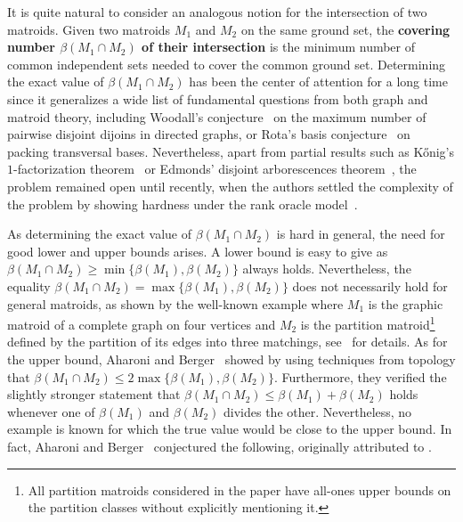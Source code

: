 \documentclass[11pt,a4paper]{article}
\theoremstyle{plain}
\theoremstyle{definition}
\begin{document}
It is quite natural to consider an analogous notion for the intersection of two matroids. Given two matroids $M_1$ and $M_2$ on the same ground set, the \textbf{covering number $\beta(M_1\cap M_2)$ of their intersection} is the minimum number of common independent sets needed to cover the common ground set. Determining the exact value of $\beta(M_1\cap M_2)$ has been the center of attention for a long time since it generalizes a wide list of fundamental questions from both graph and matroid theory, including Woodall's conjecture~\cite{woodall1978menger} on the maximum number of pairwise disjoint dijoins in directed graphs, or Rota's basis conjecture~\cite{huang1994relations} on packing transversal bases. Nevertheless, apart from partial results such as K\H{o}nig's $1$-factorization theorem~\cite{konig1916graphen} or Edmonds' disjoint arborescences theorem~\cite{edmonds1973edge}, the problem remained open until recently, when the authors settled the complexity of the problem by showing hardness under the rank oracle model~\cite{berczi2021complexity}.

As determining the exact value of $\beta(M_1\cap M_2)$ is hard in general, the need for good lower and upper bounds arises. A lower bound is easy to give as $\beta(M_1\cap M_2)\geq\min\{\beta(M_1),\beta(M_2)\}$ always holds. Nevertheless, the equality $\beta(M_1\cap M_2) = \max\{\beta(M_1), \beta(M_2)\}$ does not necessarily hold for general matroids, as shown by the well-known example where $M_1$ is the graphic matroid of a complete graph on four vertices and $M_2$ is the partition matroid\footnote{All partition matroids considered in the paper have all-ones upper bounds on the partition classes without explicitly mentioning it.} defined by the partition of its edges into three matchings, see~\cite{schrijver2003combinatorial} for details. As for the upper bound, Aharoni and Berger~\cite{aharoni2006intersection} showed by using techniques from topology that $\beta(M_1\cap M_2)\leq 2\max\{\beta(M_1),\beta(M_2)\}$. Furthermore, they verified the slightly stronger statement that $\beta(M_1\cap M_2) \le \beta(M_1)+\beta(M_2)$ holds whenever one of $\beta(M_1)$ and $\beta(M_2)$ divides the other. Nevertheless, no example is known for which the true value would be close to the upper bound. In fact, Aharoni and Berger~\cite{aharoni2012edge} conjectured the following, originally attributed to \cite{aharoni2006intersection}.
\end{document}
